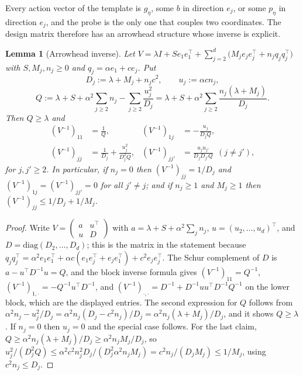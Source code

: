 \documentclass{article}
\newtheorem{lemma}{Lemma}
\theoremstyle{definition}
\theoremstyle{remark}
\theoremstyle{remark}
\begin{document}
Every action vector of the template is $g_\eta$, some $b$ in direction $e_j$,
or some $p_\eta$ in direction $e_j$, and the probe is the only one that couples
two coordinates. The design matrix therefore has an arrowhead structure whose
inverse is explicit.

\begin{lemma}[Arrowhead inverse]
\label{lem:arrowhead}
Let $V=\lambda I+Se_1e_1^\top+\sum_{j=2}^{d}\bigl(M_je_je_j^\top+n_jq_jq_j^\top\bigr)$
with $S,M_j,n_j\ge0$ and $q_j=\alpha e_1+ce_j$. Put
\[
D_j:=\lambda+M_j+n_jc^2,\qquad u_j:=\alpha cn_j,
\]
\[
Q:=\lambda+S+\alpha^2\sum_{j\ge2}n_j-\sum_{j\ge2}\frac{u_j^2}{D_j}
=\lambda+S+\alpha^2\sum_{j\ge2}\frac{n_j(\lambda+M_j)}{D_j}.
\]
Then $Q\ge\lambda$ and
\begin{align*}
(V^{-1})_{11}&=\frac1Q,&
(V^{-1})_{1j}&=-\frac{u_j}{D_jQ},\\
(V^{-1})_{jj}&=\frac1{D_j}+\frac{u_j^2}{D_j^2Q},&
(V^{-1})_{jj'}&=\frac{u_ju_{j'}}{D_jD_{j'}Q}\ \ (j\ne j'),
\end{align*}
for $j,j'\ge2$. In particular, if $n_j=0$ then
$(V^{-1})_{jj}=1/D_j$ and $(V^{-1})_{1j}=(V^{-1})_{jj'}=0$ for all $j'\ne j$; and
if $n_j\ge1$ and $M_j\ge1$ then $(V^{-1})_{jj}\le 1/D_j+1/M_j$.
\end{lemma}

\begin{proof}
Write $V=\begin{pmatrix}a&u^\top\\ u&D\end{pmatrix}$ with
$a=\lambda+S+\alpha^2\sum_jn_j$, $u=(u_2,\dots,u_d)^\top$, and
$D=\mathrm{diag}(D_2,\dots,D_d)$; this is the matrix in the statement because
$q_jq_j^\top=\alpha^2e_1e_1^\top+\alpha c(e_1e_j^\top+e_je_1^\top)+c^2e_je_j^\top$.
The Schur complement of $D$ is $a-u^\top D^{-1}u=Q$, and the block inverse
formula gives
$(V^{-1})_{11}=Q^{-1}$, $(V^{-1})_{1,\cdot}=-Q^{-1}u^\top D^{-1}$, and
$(V^{-1})_{\cdot,\cdot}=D^{-1}+D^{-1}uu^\top D^{-1}Q^{-1}$ on the lower block,
which are the displayed entries. The second expression for $Q$ follows from
$\alpha^2n_j-u_j^2/D_j=\alpha^2n_j(D_j-c^2n_j)/D_j=\alpha^2n_j(\lambda+M_j)/D_j$,
and it shows $Q\ge\lambda$. If $n_j=0$ then $u_j=0$ and the special case
follows. For the last claim, $Q\ge\alpha^2n_j(\lambda+M_j)/D_j\ge\alpha^2n_jM_j/D_j$,
so $u_j^2/(D_j^2Q)\le\alpha^2c^2n_j^2D_j/(D_j^2\alpha^2n_jM_j)=c^2n_j/(D_jM_j)\le1/M_j$,
using $c^2n_j\le D_j$.
\end{proof}
\end{document}
